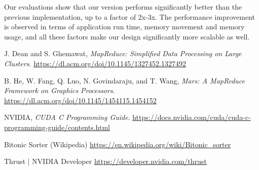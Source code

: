\documentclass{article}
\begin{document}
Our evaluations show that our version performs significantly better than the previous implementation, up to a factor of 2x-3x. The performance improvement is observed in terms of application run time, memory movement and memory usage, and all these factors make our design significantly more scalable as well. 

\begin{thebibliography}
\raggedright

J. Dean and S. Ghemawat, \textit{MapReduce: Simplified Data Processing on Large Clusters}. \href{https://dl.acm.org/doi/10.1145/1327452.1327492}{https://dl.acm.org/doi/10.1145/1327452.1327492}

B. He, W. Fang, Q. Luo, N. Govindaraju, and T. Wang, \textit{Mars: A MapReduce Framework on Graphics Processors}. \href{https://dl.acm.org/doi/10.1145/1454115.1454152}{https://dl.acm.org/doi/10.1145/1454115.1454152}

NVIDIA, \textit{CUDA C Programming Guide}. \href{https://docs.nvidia.com/cuda/cuda-c-programming-guide/contents.html}{https://docs.nvidia.com/cuda/cuda-c-programming-guide/contents.html}


Bitonic Sorter (Wikipedia) \href{https://en.wikipedia.org/wiki/Bitonic_sorter}{https://en.wikipedia.org/wiki/Bitonic\_sorter}


Thrust | NVIDIA Developer \href{https://developer.nvidia.com/thrust}{https://developer.nvidia.com/thrust}

\end{thebibliography}
\end{document}
